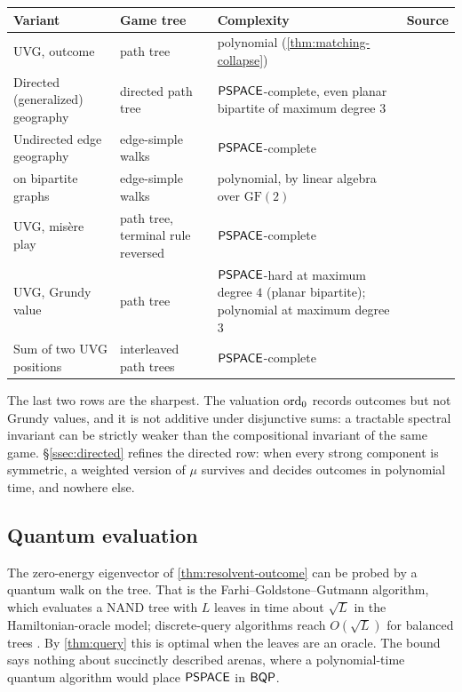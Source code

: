 \begin{center}
\begin{tabularx}{\linewidth}{@{}L{0.24}L{0.2}>{\raggedright\arraybackslash}X L{0.19}@{}}
\toprule
Variant & Game tree & Complexity & Source\\ \midrule
UVG, outcome & path tree & polynomial (\cref{thm:matching-collapse}) & \cite{FSU}\\
Directed (generalized) geography & directed path tree & $\mathsf{PSPACE}$-complete, even planar bipartite of maximum degree $3$ & \cite{LichtensteinSipser}\\
Undirected edge geography & edge-simple walks & $\mathsf{PSPACE}$-complete & \cite{FSU}\\
\quad on bipartite graphs & edge-simple walks & polynomial, by linear algebra over $\mathrm{GF}(2)$ & \cite{FSU}\\
UVG, mis\`ere play & path tree, terminal rule reversed & $\mathsf{PSPACE}$-complete & \cite{RenaultSchmidt}\\
UVG, Grundy value & path tree & $\mathsf{PSPACE}$-hard at maximum degree $4$ (planar bipartite); polynomial at maximum degree $3$ & \cite{BFT}\\
Sum of two UVG positions & interleaved path trees & $\mathsf{PSPACE}$-complete & \cite{BFT}\\
\bottomrule
\end{tabularx}
\end{center}

The last two rows are the sharpest. The valuation $\operatorname{ord}_0$ records outcomes but not Grundy values, and it is not additive under disjunctive sums: a tractable spectral invariant can be strictly weaker than the compositional invariant of the same game. \S\ref{ssec:directed} refines the directed row: when every strong component is symmetric, a weighted version of $\mu$ survives and decides outcomes in polynomial time, and nowhere else.

\subsection{Quantum evaluation}
The zero-energy eigenvector of \cref{thm:resolvent-outcome} can be probed by a quantum walk on the tree. That is the Farhi--Goldstone--Gutmann algorithm, which evaluates a NAND tree with $L$ leaves in time about $\sqrt L$ in the Hamiltonian-oracle model; discrete-query algorithms reach $O(\sqrt L)$ for balanced trees \cite{ACRSZ}. By \cref{thm:query} this is optimal when the leaves are an oracle. The bound says nothing about succinctly described arenas, where a polynomial-time quantum algorithm would place $\mathsf{PSPACE}$ in $\mathsf{BQP}$.

